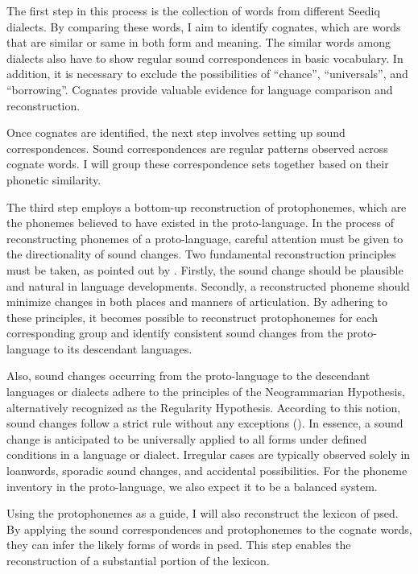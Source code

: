 The first step in this process is the collection of words from different Seediq dialects. By comparing these words, I aim to identify cognates, which are words that are similar or same in both form and meaning. The similar words among dialects also have to show regular sound correspondences in basic vocabulary. In addition, it is necessary to exclude the possibilities of ``chance'', ``universals'', and ``borrowing''. Cognates provide valuable evidence for language comparison and reconstruction.

Once cognates are identified, the next step involves setting up sound correspondences. Sound correspondences are regular patterns observed across cognate words. I will group these correspondence sets together based on their phonetic similarity. 

The third step employs a bottom-up reconstruction of protophonemes, which are the phonemes believed to have existed in the proto-language. In the process of reconstructing phonemes of a proto-language, careful attention must be given to the directionality of sound changes. Two fundamental reconstruction principles must be taken, as pointed out by \textcite[85]{crowley2010introduction}. Firstly, the sound change should be plausible and natural in language developments. Secondly, a reconstructed phoneme should minimize changes in both places and manners of articulation. By adhering to these principles, it becomes possible to reconstruct protophonemes for each corresponding group and identify consistent sound changes from the proto-language to its descendant languages.

Also, sound changes occurring from the proto-language to the descendant languages or dialects adhere to the principles of the Neogrammarian Hypothesis, alternatively recognized as the Regularity Hypothesis. According to this notion, sound changes follow a strict rule without any exceptions (\cite{brugmann1878morphologische}). In essence, a sound change is anticipated to be universally applied to all forms under defined conditions in a language or dialect. Irregular cases are typically observed solely in loanwords, sporadic sound changes, and accidental possibilities. For the phoneme inventory in the proto-language, we also expect it to be a balanced system. 

Using the protophonemes as a guide, I will also reconstruct the lexicon of \acl{psed}. By applying the sound correspondences and protophonemes to the cognate words, they can infer the likely forms of words in \acl{psed}. This step enables the reconstruction of a substantial portion of the lexicon.

